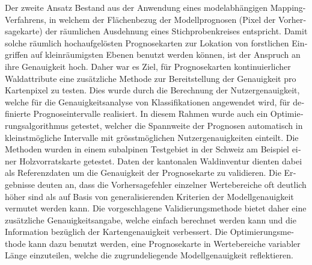\begin{otherlanguage}{ngerman}
Der zweite Ansatz Bestand aus der Anwendung eines modelabhängigen Mapping-Verfahrens, in welchem der Flächenbezug der Modellprognosen (Pixel der Vorhersagekarte) der räumlichen Ausdehnung eines Stichprobenkreises entspricht. Damit solche räumlich hochaufgelösten Prognosekarten zur Lokation von forstlichen Eingriffen auf kleinräumigsten Ebenen benutzt werden können, ist der Anspruch an ihre Genauigkeit hoch. Daher war es Ziel, für Prognosekarten kontinuierlicher Waldattribute eine zusätzliche Methode zur Bereitstellung der Genauigkeit pro Kartenpixel zu testen. Dies wurde durch die Berechnung der Nutzergenauigkeit, welche für die Genauigkeitsanalyse von Klassifikationen angewendet wird, für definierte Prognoseintervalle realisiert. In diesem Rahmen wurde auch ein Optimierungsalgorithmus getestet, welcher die Spannweite der Prognosen automatisch in kleinstmögliche Intervalle mit grösstmöglichen Nutzergenauigkeiten einteilt. Die Methoden wurden in einem subalpinen Testgebiet in der Schweiz am Beispiel einer Holzvorratskarte getestet. Daten der kantonalen Waldinventur dienten dabei als Referenzdaten um die Genauigkeit der Prognosekarte zu validieren. Die Ergebnisse deuten an, dass die Vorhersagefehler einzelner Wertebereiche oft deutlich höher sind als auf Basis von generalisierenden Kriterien der Modellgenauigkeit vermutet werden kann. Die vorgeschlagene Validierungsmethode bietet daher eine zusätzliche Genauigkeitsangabe, welche einfach berechnet werden kann und die Information bezüglich der Kartengenauigkeit verbessert. Die Optimierungsmethode kann dazu benutzt werden, eine Prognosekarte in Wertebereiche variabler Länge einzuteilen, welche die zugrundeliegende Modellgenauigkeit reflektieren.

\end{otherlanguage}



